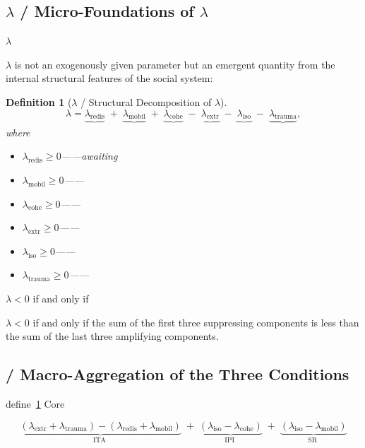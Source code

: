 \documentclass[11pt,a4paper]{article}
\newtheorem{definition}[theorem]{Definition}
\theoremstyle{remark}
\newcommand{\lambdaparam}{\lambda}
\begin{document}
\subsection{$\lambdaparam$  / Micro-Foundations of $\lambdaparam$}

$\lambdaparam$ 

$\lambdaparam$ is not an exogenously given parameter but an emergent quantity from the
internal structural features of the social system:

\begin{definition}[$\lambdaparam$  / Structural Decomposition of $\lambdaparam$]
\label{def:lambda_decomp}
\[
\lambdaparam = \underbrace{\lambdaparam_{\text{redis}}}_{\text{}} \;+\;
              \underbrace{\lambdaparam_{\text{mobil}}}_{\text{}} \;+\;
              \underbrace{\lambdaparam_{\text{cohe}}}_{\text{}} \;-\;
              \underbrace{\lambdaparam_{\text{extr}}}_{\text{}} \;-\;
              \underbrace{\lambdaparam_{\text{iso}}}_{\text{}} \;-\;
              \underbrace{\lambdaparam_{\text{trauma}}}_{\text{}},
\]
where
\begin{itemize}
    \item $\lambdaparam_{\text{redis}} \geq 0$——awaiting
    \item $\lambdaparam_{\text{mobil}} \geq 0$——
    \item $\lambdaparam_{\text{cohe}} \geq 0$——
    \item $\lambdaparam_{\text{extr}} \geq 0$——
    \item $\lambdaparam_{\text{iso}} \geq 0$——
    \item $\lambdaparam_{\text{trauma}} \geq 0$——
\end{itemize}
\end{definition}

$\lambdaparam < 0$ if and only if

$\lambdaparam < 0$ if and only if the sum of the first three suppressing components is
less than the sum of the last three amplifying components.

\subsection{ / Macro-Aggregation of the Three Conditions}

define~\ref{def:lambda_decomp} 
Core

\[
\underbrace{(\lambdaparam_{\text{extr}} + \lambdaparam_{\text{trauma}}) -
            (\lambdaparam_{\text{redis}} + \lambdaparam_{\text{mobil}})}_{\text{ITA }}
\;+\;
\underbrace{(\lambdaparam_{\text{iso}} - \lambdaparam_{\text{cohe}})}_{\text{IPI }}
\;+\;
\underbrace{(\lambdaparam_{\text{iso}} - \lambdaparam_{\text{mobil}})}_{\text{SR }}
\]
\end{document}
